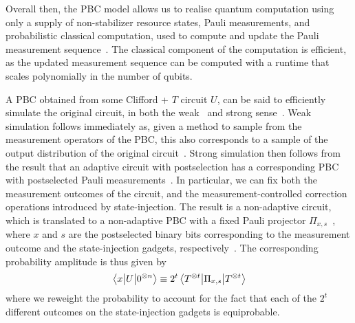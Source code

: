 Overall then, the PBC model allows us to realise quantum computation using only a supply of non-stabilizer resource states, Pauli measurements, and probabilistic classical computation, used to compute and update the Pauli measurement sequence~\cite{Yoganathan2019}. The classical component of the computation is efficient, as the updated measurement sequence can be computed with a runtime that scales polynomially in the number of qubits.\par
A PBC obtained from some Clifford + $T$ circuit $U$, can be said to efficiently simulate the original circuit, in both the weak~\cite{Yoganathan2019} and strong sense~\cite{Bravyi2015}. Weak simulation follows immediately as, given a method to sample from the measurement operators of the PBC, this also corresponds to a sample of the output distribution of the original circuit~\cite{Yoganathan2019}. Strong simulation then follows from the result that an adaptive circuit with postselection has a corresponding PBC with postselected Pauli measurements~\cite{Yoganathan2019}. In particular, we can fix both the measurement outcomes of the circuit, and the measurement-controlled correction operations introduced by state-injection. The result is a non-adaptive circuit, which is translated to a non-adaptive PBC with a fixed Pauli projector $\Pi_{x,s}$~\cite{Yoganathan2019}, where $x$ and $s$ are the postselected binary bits corresponding to the measurement outcome and the state-injection gadgets, respectively~\cite{Bravyi2015,Bravyi2016}. The corresponding probability amplitude is thus given by
\begin{equation}
\matrixel{x}{U}{0^{\otimes n}}\equiv 2^{t}\matrixel{T^{\otimes t}}{\Pi_{x,s}}{T^{\otimes t}}
\label{eq:pbc_strongsim}
\end{equation}
where we reweight the probability to account for the fact that each of the $2^{t}$ different outcomes on the state-injection gadgets is equiprobable.
